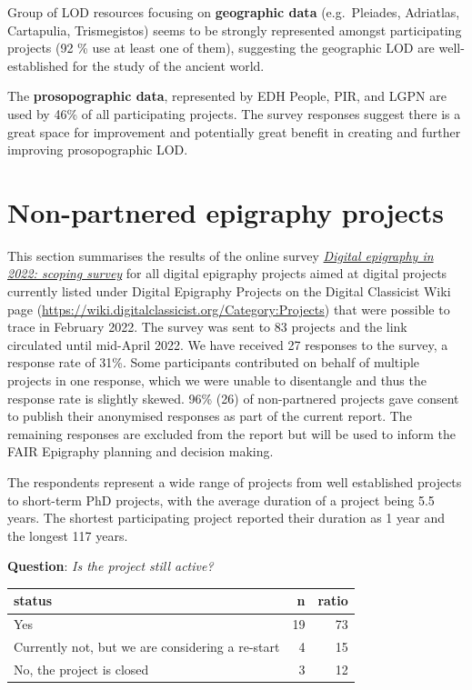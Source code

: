 \documentclass[
  12pt,
]{scrreprt}
\begin{document}
\normalsize

Group of LOD resources focusing on \textbf{geographic data}
(e.g.~Pleiades, Adriatlas, Cartapulia, Trismegistos) seems to be
strongly represented amongst participating projects (92 \% use at least
one of them), suggesting the geographic LOD are well-established for the
study of the ancient world.

The \textbf{prosopographic data}, represented by EDH People, PIR, and
LGPN are used by 46\% of all participating projects. The survey
responses suggest there is a great space for improvement and potentially
great benefit in creating and further improving prosopographic LOD.

\hypertarget{non-partnered-epigraphy-projects}{%
\chapter{Non-partnered epigraphy
projects}\label{non-partnered-epigraphy-projects}}

This section summarises the results of the online survey
\href{https://github.com/FAIR-epigraphy/scoping_survey_report/data/02_Survey_projects_questions.pdf}{\emph{Digital
epigraphy in 2022: scoping survey}} for all digital epigraphy projects
aimed at digital projects currently listed under Digital Epigraphy
Projects on the Digital Classicist Wiki page
(\url{https://wiki.digitalclassicist.org/Category:Projects}) that were
possible to trace in February 2022. The survey was sent to 83 projects
and the link circulated until mid-April 2022. We have received 27
responses to the survey, a response rate of 31\%. Some participants
contributed on behalf of multiple projects in one response, which we
were unable to disentangle and thus the response rate is slightly
skewed. 96\% (26) of non-partnered projects gave consent to publish
their anonymised responses as part of the current report. The remaining
responses are excluded from the report but will be used to inform the
FAIR Epigraphy planning and decision making.

The respondents represent a wide range of projects from well established
projects to short-term PhD projects, with the average duration of a
project being 5.5 years. The shortest participating project reported
their duration as 1 year and the longest 117 years.

\textbf{Question}: \emph{Is the project still active?}

\footnotesize

\begin{longtable}[]{@{}lrr@{}}
\toprule
status & n & ratio \\
\midrule
\endhead
Yes & 19 & 73 \\
Currently not, but we are considering a re-start & 4 & 15 \\
No, the project is closed & 3 & 12 \\
\bottomrule
\end{longtable}
\end{document}
